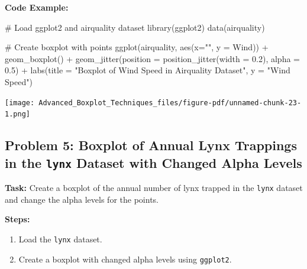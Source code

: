 \documentclass[
  letterpaper,
  DIV=11,
  numbers=noendperiod]{scrreprt}
\newenvironment{Shaded}{\begin{snugshade}}{\end{snugshade}}
\newcommand{\AttributeTok}[1]{\textcolor[rgb]{0.40,0.45,0.13}{#1}}
\newcommand{\CommentTok}[1]{\textcolor[rgb]{0.37,0.37,0.37}{#1}}
\newcommand{\FloatTok}[1]{\textcolor[rgb]{0.68,0.00,0.00}{#1}}
\newcommand{\FunctionTok}[1]{\textcolor[rgb]{0.28,0.35,0.67}{#1}}
\newcommand{\NormalTok}[1]{\textcolor[rgb]{0.00,0.23,0.31}{#1}}
\newcommand{\SpecialCharTok}[1]{\textcolor[rgb]{0.37,0.37,0.37}{#1}}
\newcommand{\StringTok}[1]{\textcolor[rgb]{0.13,0.47,0.30}{#1}}
\providecommand{\tightlist}{%
  \setlength{\itemsep}{0pt}\setlength{\parskip}{0pt}}\usepackage{longtable,booktabs,array}
\begin{document}
\textbf{Code Example:}

\begin{Shaded}
\begin{Highlighting}[]
\CommentTok{\# Load ggplot2 and airquality dataset}
\FunctionTok{library}\NormalTok{(ggplot2)}
\FunctionTok{data}\NormalTok{(airquality)}

\CommentTok{\# Create boxplot with points}
\FunctionTok{ggplot}\NormalTok{(airquality, }\FunctionTok{aes}\NormalTok{(}\AttributeTok{x=}\StringTok{""}\NormalTok{, }\AttributeTok{y =}\NormalTok{ Wind)) }\SpecialCharTok{+}
  \FunctionTok{geom\_boxplot}\NormalTok{() }\SpecialCharTok{+}
  \FunctionTok{geom\_jitter}\NormalTok{(}\AttributeTok{position =} \FunctionTok{position\_jitter}\NormalTok{(}\AttributeTok{width =} \FloatTok{0.2}\NormalTok{), }\AttributeTok{alpha =} \FloatTok{0.5}\NormalTok{) }\SpecialCharTok{+}
  \FunctionTok{labs}\NormalTok{(}\AttributeTok{title =} \StringTok{"Boxplot of Wind Speed in Airquality Dataset"}\NormalTok{, }\AttributeTok{y =} \StringTok{"Wind Speed"}\NormalTok{)}
\end{Highlighting}
\end{Shaded}

\texttt{[image: Advanced\_Boxplot\_Techniques\_files/figure-pdf/unnamed-chunk-23-1.png]}

\subsection*{\texorpdfstring{Problem 5: Boxplot of Annual Lynx Trappings
in the \texttt{lynx} Dataset with Changed Alpha
Levels}{Problem 5: Boxplot of Annual Lynx Trappings in the lynx Dataset with Changed Alpha Levels}}\label{problem-5-boxplot-of-annual-lynx-trappings-in-the-lynx-dataset-with-changed-alpha-levels}

\textbf{Task:} Create a boxplot of the annual number of lynx trapped in
the \texttt{lynx} dataset and change the alpha levels for the points.

\textbf{Steps:}

\begin{enumerate}
\def\labelenumi{\arabic{enumi}.}
\tightlist
\item
  Load the \texttt{lynx} dataset.
\item
  Create a boxplot with changed alpha levels using \texttt{ggplot2}.
\end{enumerate}
\end{document}
